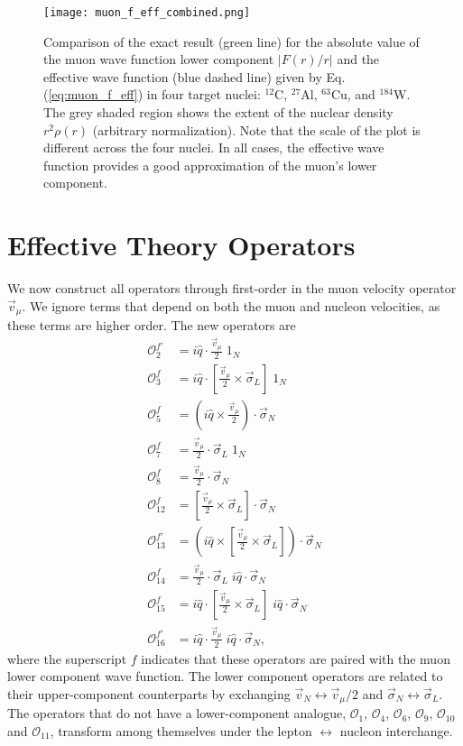 \documentclass{book}[letterpaper,12pt]
\begin{document}
\begin{figure}
\centering
\texttt{[image: muon\_f\_eff\_combined.png]}
\caption{Comparison of the exact result (green line) for the absolute value of the muon wave function lower component $|F(r)/r|$ and the effective wave function (blue dashed line) given by Eq. (\ref{eq:muon_f_eff}) in four target nuclei: $^{12}$C, $^{27}$Al, $^{63}$Cu, and $^{184}$W. The grey shaded region shows the extent of the nuclear density $r^2\rho(r)$ (arbitrary normalization). Note that the scale of the plot is different across the four nuclei. In all cases, the effective wave function provides a good approximation of the muon's lower component.} 
\label{fig:muon_f_eff}
\end{figure}


\section{Effective Theory Operators}
We now construct all operators through first-order in the muon velocity operator $\vec{v}_{\mu}$. We ignore terms that depend on both the muon and nucleon velocities, as these terms are higher order. The new operators are
\begin{equation}
\begin{split}
\mathcal{O}_2^{f'}&=i\hat{q}\cdot\frac{\vec{v}_{\mu}}{2}\;1_N\\
\mathcal{O}_3^f&=i\hat{q}\cdot\left[\frac{\vec{v}_{\mu}}{2}\times\vec{\sigma}_L\right]\;1_N\\
\mathcal{O}_5^f&=\left(i\hat{q}\times\frac{\vec{v}_{\mu}}{2}\right)\cdot\vec{\sigma}_N\\
\mathcal{O}_7^f&=\frac{\vec{v}_{\mu}}{2}\cdot\vec{\sigma}_L\;1_N\\
\mathcal{O}_8^f&=\frac{\vec{v}_{\mu}}{2}\cdot\vec{\sigma}_N\\
\mathcal{O}_{12}^f&=\left[\frac{\vec{v}_{\mu}}{2}\times\vec{\sigma}_L\right]\cdot\vec{\sigma}_N\\
\mathcal{O}_{13}^{f'}&=\left(i\hat{q}\times\left[\frac{\vec{v}_{\mu}}{2}\times\vec{\sigma}_L\right]\right)\cdot\vec{\sigma}_N\\
\mathcal{O}_{14}^f&=\frac{\vec{v}_{\mu}}{2}\cdot\vec{\sigma}_L\;i\hat{q}\cdot\vec{\sigma}_N\\
\mathcal{O}_{15}^f&=i\hat{q}\cdot\left[\frac{\vec{v}_{\mu}}{2}\times\vec{\sigma}_L\right]\;i\hat{q}\cdot\vec{\sigma}_N\\
\mathcal{O}_{16}^{f'}&=i\hat{q}\cdot\frac{\vec{v}_{\mu}}{2}\;i\hat{q}\cdot\vec{\sigma}_N,
\end{split}
\end{equation}
where the superscript $f$ indicates that these operators are paired with the muon lower component wave function. The lower component operators are related to their upper-component counterparts by exchanging $\vec{v}_N\leftrightarrow \vec{v}_{\mu}/2$ and $\vec{\sigma}_N\leftrightarrow\vec{\sigma}_L$. The operators that do not have a lower-component analogue, $\mathcal{O}_1$, $\mathcal{O}_4$, $\mathcal{O}_6$, $\mathcal{O}_9$, $\mathcal{O}_{10}$ and $\mathcal{O}_{11}$, transform among themselves under the lepton $\leftrightarrow$ nucleon interchange.
\end{document}
